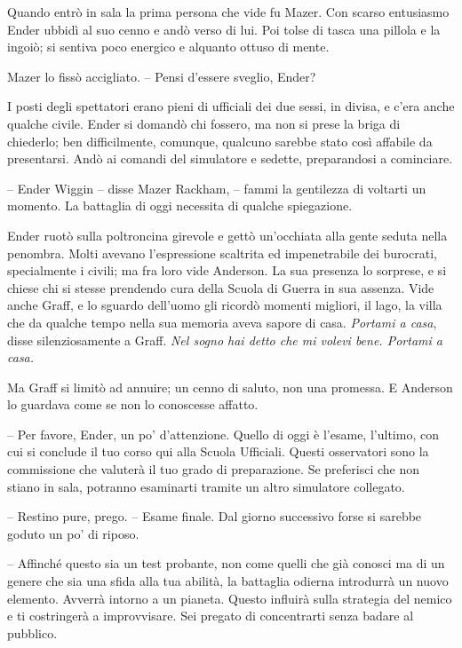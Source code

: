 {Quando entrò in sala la prima persona che vide fu Mazer. Con scarso
	entusiasmo Ender ubbidì al suo cenno e andò verso di lui. Poi tolse di
	tasca una pillola e la ingoiò; si sentiva poco energico e alquanto
	ottuso di mente.}

{Mazer lo fissò accigliato. -- Pensi d'essere sveglio, Ender?}

{I posti degli spettatori erano pieni di ufficiali dei due sessi, in
	divisa, e c'era anche qualche civile. Ender si domandò chi fossero, ma
	non si prese la briga di chiederlo; ben difficilmente, comunque,
	qualcuno sarebbe stato così affabile da presentarsi. Andò ai comandi del
	simulatore e sedette, preparandosi a cominciare.}

{-- Ender Wiggin -- disse Mazer Rackham, -- fammi la gentilezza di
	voltarti un momento. La battaglia di oggi necessita di qualche
	spiegazione.}

{Ender ruotò sulla poltroncina girevole e gettò un'occhiata alla gente
	seduta nella penombra. Molti avevano l'espressione scaltrita ed
	impenetrabile dei burocrati, specialmente i civili; ma fra loro vide
	Anderson. La sua presenza lo sorprese, e si chiese chi si stesse
	prendendo cura della Scuola di Guerra in sua assenza. Vide anche Graff,
	e lo sguardo dell'uomo gli ricordò momenti migliori, il lago, la villa
	che da qualche tempo nella sua memoria aveva sapore di casa.
	\emph{Portami a casa}, \emph{} disse silenziosamente a Graff. \emph{Nel
		sogno hai detto che mi volevi bene. Portami a casa.}}

{Ma Graff si limitò ad annuire; un cenno di saluto, non una promessa. E
	Anderson lo guardava come se non lo conoscesse affatto.}

{-- Per favore, Ender, un po' d'attenzione. Quello di oggi è l'esame,
	l'ultimo, con cui si conclude il tuo corso qui alla Scuola Ufficiali.
	Questi osservatori sono la commissione che valuterà il tuo grado di
	preparazione. Se preferisci che non stiano in sala, potranno esaminarti
	tramite un altro simulatore collegato.}

{-- Restino pure, prego. -- Esame finale. Dal giorno successivo forse si
	sarebbe goduto un po' di riposo.}

{-- Affinché questo sia un test probante, non come quelli che già
	conosci ma di un genere che sia una sfida alla tua abilità, la battaglia
	odierna introdurrà un nuovo elemento. Avverrà intorno a un pianeta.
	Questo influirà sulla strategia del nemico e ti costringerà a
	improvvisare. Sei pregato di concentrarti senza badare al pubblico.}

